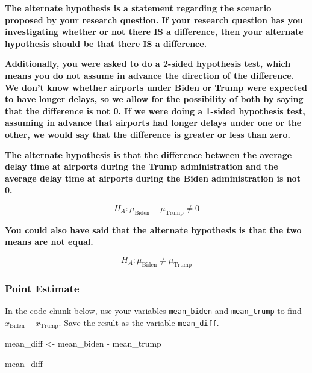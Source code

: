 \documentclass[
  letterpaper,
  DIV=11,
  numbers=noendperiod]{scrartcl}
\newenvironment{Shaded}{\begin{snugshade}}{\end{snugshade}}
\newcommand{\NormalTok}[1]{\textcolor[rgb]{0.00,0.23,0.31}{#1}}
\newcommand{\OtherTok}[1]{\textcolor[rgb]{0.00,0.23,0.31}{#1}}
\newcommand{\SpecialCharTok}[1]{\textcolor[rgb]{0.37,0.37,0.37}{#1}}
\begin{document}
\begin{tcolorbox}[enhanced jigsaw, colback=white, breakable, arc=.35mm, left=2mm, colframe=quarto-callout-warning-color-frame, opacityback=0, rightrule=.15mm, toprule=.15mm, bottomrule=.15mm, leftrule=.75mm]

\textbf{The alternate hypothesis is a statement regarding the scenario
proposed by your research question. If your research question has you
investigating whether or not there IS a difference, then your alternate
hypothesis should be that there IS a difference.}

\textbf{Additionally, you were asked to do a 2-sided hypothesis test,
which means you do not assume in advance the direction of the
difference. We don't know whether airports under Biden or Trump were
expected to have longer delays, so we allow for the possibility of both
by saying that the difference is not 0. If we were doing a 1-sided
hypothesis test, assuming in advance that airports had longer delays
under one or the other, we would say that the difference is greater or
less than zero.}

\textbf{The alternate hypothesis is that the difference between the
average delay time at airports during the Trump administration and the
average delay time at airports during the Biden administration is not
0.}

\[
H_A \colon \mu_{\text{Biden}}-\mu_{\text{Trump}} \ne 0
\]

\textbf{You could also have said that the alternate hypothesis is that
the two means are not equal.}

\[
H_A \colon \mu_{\text{Biden}} \ne \mu_{\text{Trump}}
\]

\end{tcolorbox}

\subsubsection{Point Estimate}\label{point-estimate-1}

In the code chunk below, use your variables \texttt{mean\_biden} and
\texttt{mean\_trump} to find
\(\bar{x}_{\text{Biden}}-\bar{x}_{\text{Trump}}\). Save the result as
the variable \texttt{mean\_diff}.

\begin{Shaded}
\begin{Highlighting}[]
\NormalTok{mean\_diff }\OtherTok{\textless{}{-}}\NormalTok{ mean\_biden }\SpecialCharTok{{-}}\NormalTok{ mean\_trump}

\NormalTok{mean\_diff}
\end{Highlighting}
\end{Shaded}
\end{document}
